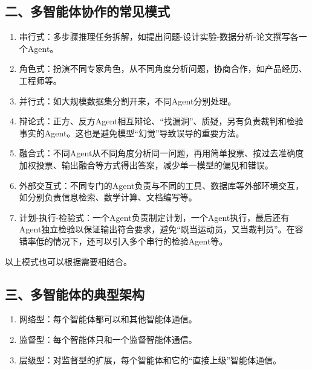 \hypertarget{ux4e8cux591aux667aux80fdux4f53ux534fux4f5cux7684ux5e38ux89c1ux6a21ux5f0f}{%
\subsection{二、多智能体协作的常见模式}\label{ux4e8cux591aux667aux80fdux4f53ux534fux4f5cux7684ux5e38ux89c1ux6a21ux5f0f}}

\begin{enumerate}
\def\labelenumi{\arabic{enumi}.}
\item
  串行式：多步骤推理任务拆解，如提出问题-设计实验-数据分析-论文撰写各一个Agent。
\item
  角色式：扮演不同专家角色，从不同角度分析问题，协商合作，如产品经历、工程师等。
\item
  并行式：如大规模数据集分割开来，不同Agent分别处理。
\item
  辩论式：正方、反方Agent相互辩论、``找漏洞''、质疑，另有负责裁判和检验事实的Agent。这也是避免模型``幻觉''导致误导的重要方法。
\item
  融合式：不同Agent从不同角度分析同一问题，再用简单投票、按过去准确度加权投票、输出融合等方式得出答案，减少单一模型的偏见和错误。
\item
  外部交互式：不同专门的Agent负责与不同的工具、数据库等外部环境交互，如分别负责信息检索、数学计算、文档编写等。
\item
  计划-执行-检验式：一个Agent负责制定计划，一个Agent执行，最后还有Agent独立检验以保证输出符合要求，避免``既当运动员，又当裁判员''。在容错率低的情况下，还可以引入多个串行的检验Agent等。
\end{enumerate}

以上模式也可以根据需要相结合。

\hypertarget{ux4e09ux591aux667aux80fdux4f53ux7684ux5178ux578bux67b6ux6784}{%
\subsection{三、多智能体的典型架构}\label{ux4e09ux591aux667aux80fdux4f53ux7684ux5178ux578bux67b6ux6784}}

\begin{enumerate}
\def\labelenumi{\arabic{enumi}.}
\item
  网络型：每个智能体都可以和其他智能体通信。
\item
  监督型：每个智能体只和一个监督智能体通信。
\item
  层级型：对监督型的扩展，每个智能体和它的``直接上级''智能体通信。
\end{enumerate}

